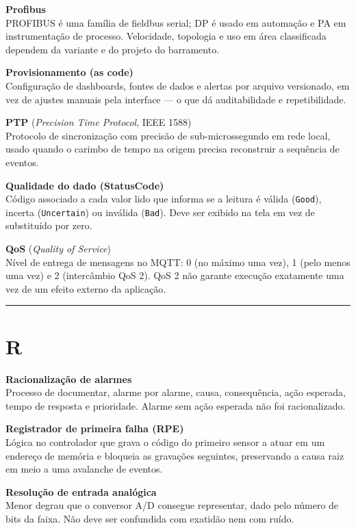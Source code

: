 \textbf{Profibus}\\
PROFIBUS é uma família de fieldbus serial; DP é usado em automação e PA em instrumentação de processo. Velocidade, topologia e uso em área classificada dependem da variante e do projeto do barramento.

\textbf{Provisionamento (as code)}\\
Configuração de dashboards, fontes de dados e alertas por arquivo versionado, em vez de ajustes manuais pela interface --- o que dá auditabilidade e repetibilidade.

\textbf{PTP} (\emph{Precision Time Protocol}, IEEE 1588)\\
Protocolo de sincronização com precisão de sub-microssegundo em rede local, usado quando o carimbo de tempo na origem precisa reconstruir a sequência de eventos.

\textbf{Qualidade do dado (StatusCode)}\\
Código associado a cada valor lido que informa se a leitura é válida (\passthrough{\lstinline!Good!}), incerta (\passthrough{\lstinline!Uncertain!}) ou inválida (\passthrough{\lstinline!Bad!}). Deve ser exibido na tela em vez de substituído por zero.

\textbf{QoS} (\emph{Quality of Service})\\
Nível de entrega de mensagens no MQTT: 0 (no máximo uma vez), 1 (pelo menos uma vez) e 2 (intercâmbio QoS 2). QoS 2 não garante execução exatamente uma vez de um efeito externo da aplicação.

\begin{center}\rule{0.5\linewidth}{0.5pt}\end{center}

\section{R}\label{r}

\textbf{Racionalização de alarmes}\\
Processo de documentar, alarme por alarme, causa, consequência, ação esperada, tempo de resposta e prioridade. Alarme sem ação esperada não foi racionalizado.

\textbf{Registrador de primeira falha (RPE)}\\
Lógica no controlador que grava o código do primeiro sensor a atuar em um endereço de memória e bloqueia as gravações seguintes, preservando a causa raiz em meio a uma avalanche de eventos.

\textbf{Resolução de entrada analógica}\\
Menor degrau que o conversor A/D consegue representar, dado pelo número de bits da faixa. Não deve ser confundida com exatidão nem com ruído.


